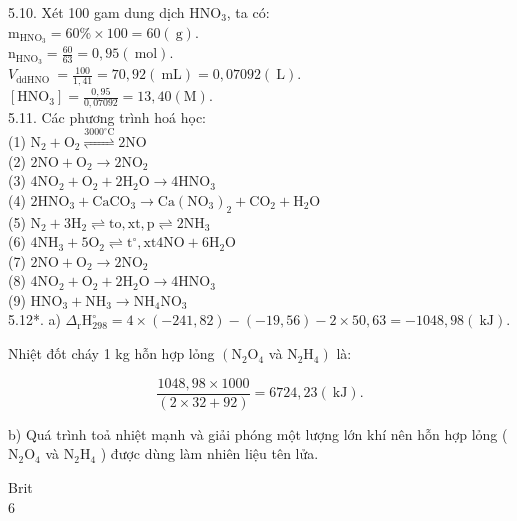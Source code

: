 \documentclass[10pt]{article}
\begin{document}
5.10. Xét 100 gam dung dịch $\mathrm{HNO}_{3}$, ta có:\\
$\mathrm{m}_{\mathrm{HNO}_{3}}=60 \% \times 100=60(\mathrm{~g})$.\\
$\mathrm{n}_{\mathrm{HNO}_{3}}=\frac{60}{63}=0,95(\mathrm{~mol})$.\\
$V_{\text {ddHNO }}=\frac{100}{1,41}=70,92(\mathrm{~mL})=0,07092(\mathrm{~L})$.\\
$\left[\mathrm{HNO}_{3}\right]=\frac{0,95}{0,07092}=13,40(\mathrm{M})$.\\
5.11. Các phương trình hoá học:\\
(1) $\mathrm{N}_{2}+\mathrm{O}_{2} \stackrel{3000^{\circ} \mathrm{C}}{\rightleftharpoons} 2 \mathrm{NO}$\\
(2) $2 \mathrm{NO}+\mathrm{O}_{2} \rightarrow 2 \mathrm{NO}_{2}$\\
(3) $4 \mathrm{NO}_{2}+\mathrm{O}_{2}+2 \mathrm{H}_{2} \mathrm{O} \rightarrow 4 \mathrm{HNO}_{3}$\\
(4) $2 \mathrm{HNO}_{3}+\mathrm{CaCO}_{3} \rightarrow \mathrm{Ca}\left(\mathrm{NO}_{3}\right)_{2}+\mathrm{CO}_{2}+\mathrm{H}_{2} \mathrm{O}$\\
(5) $\mathrm{N}_{2}+3 \mathrm{H}_{2} \rightleftharpoons \mathrm{to}, \mathrm{xt}, \mathrm{p} \rightleftharpoons 2 \mathrm{NH}_{3}$\\
(6) $4 \mathrm{NH}_{3}+5 \mathrm{O}_{2} \rightleftharpoons \mathrm{t}^{\circ}, \mathrm{xt} 4 \mathrm{NO}+6 \mathrm{H}_{2} \mathrm{O}$\\
(7) $2 \mathrm{NO}+\mathrm{O}_{2} \rightarrow 2 \mathrm{NO}_{2}$\\
(8) $4 \mathrm{NO}_{2}+\mathrm{O}_{2}+2 \mathrm{H}_{2} \mathrm{O} \rightarrow 4 \mathrm{HNO}_{3}$\\
(9) $\mathrm{HNO}_{3}+\mathrm{NH}_{3} \rightarrow \mathrm{NH}_{4} \mathrm{NO}_{3}$\\
5.12*. a) $\Delta_{\mathrm{r}} \mathrm{H}_{298}^{\circ}=4 \times(-241,82)-(-19,56)-2 \times 50,63=-1048,98(\mathrm{~kJ})$.

Nhiệt đốt cháy 1 kg hỗn hợp lỏng $\left(\mathrm{N}_{2} \mathrm{O}_{4}\right.$ và $\left.\mathrm{N}_{2} \mathrm{H}_{4}\right)$ là:

$$
\frac{1048,98 \times 1000}{(2 \times 32+92)}=6724,23(\mathrm{~kJ}) .
$$

b) Quá trình toả nhiệt mạnh và giải phóng một lượng lớn khí nên hỗn hợp lỏng ( $\mathrm{N}_{2} \mathrm{O}_{4}$ và $\mathrm{N}_{2} \mathrm{H}_{4}$ ) được dùng làm nhiên liệu tên lửa.

Brit\\
6
\end{document}
